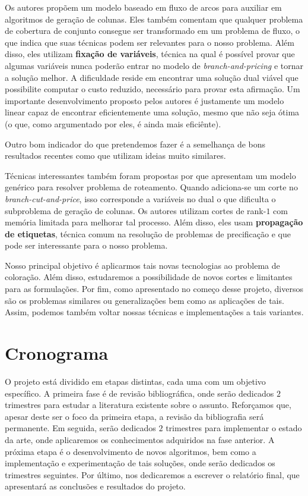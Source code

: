 \documentclass[11pt]{article}
\begin{document}
Os autores propõem um modelo baseado em fluxo de arcos para auxiliar em algoritmos de geração de colunas.
Eles também comentam que qualquer problema de cobertura de conjunto consegue ser transformado em um problema de fluxo, o que indica que suas técnicas podem ser relevantes para o nosso problema.
Além disso, eles utilizam \textbf{fixação de variáveis}, técnica na qual é possível provar que algumas variáveis nunca poderão entrar no modelo de \emph{branch-and-pricing} e tornar a solução melhor.
A dificuldade reside em encontrar uma solução dual viável que possibilite computar o custo reduzido, necessário para provar esta afirmação.
Um importante desenvolvimento proposto pelos autores é justamente um modelo linear capaz de encontrar eficientemente uma solução, mesmo que não seja ótima (o que, como argumentado por eles, é ainda mais eficiênte).

Outro bom indicador do que pretendemos fazer é a semelhança de bons resultados recentes como \autocite{Hoeve2021Graphcoloringdecision} que utilizam ideias muito similares.

Técnicas interessantes também foram propostas por \textcite{Pessoa2021SolvingBinPacking} que apresentam um modelo genérico para resolver problema de roteamento.
Quando adiciona-se um corte no \emph{branch-cut-and-price}, isso corresponde a variáveis no dual o que dificulta o subproblema de geração de colunas.
Os autores utilizam cortes de rank-\(1\) com memória limitada para melhorar tal processo.
Além disso, eles usam \textbf{propagação de etiquetas}, técnica comum na resolução de problemas de precificação e que pode ser interessante para o nosso problema.

Nosso principal objetivo é aplicarmos tais novas tecnologias ao problema de coloração.
Além disso, estudaremos a possibilidade de novos cortes e limitantes para as formulações.
Por fim, como apresentado no começo desse projeto, diversos são os problemas similares ou generalizações bem como as aplicações de tais.
Assim, podemos também voltar nossas técnicas e implementações a tais variantes.

\section{Cronograma}
\label{sec:orgd65f956}
O projeto está dividido em etapas distintas, cada uma com um objetivo específico.
A primeira fase é de revisão bibliográfica, onde serão dedicados \(2\) trimestres para estudar a literatura existente sobre o assunto.
Reforçamos que, apesar deste ser o foco da primeira etapa, a revisão da bibliografia será permanente.
Em seguida, serão dedicados \(2\) trimestres para implementar o estado da arte, onde aplicaremos os conhecimentos adquiridos na fase anterior.
A próxima etapa é o desenvolvimento de novos algoritmos, bem como a implementação e experimentação de tais soluções, onde serão dedicados os trimestres seguintes.
Por último, nos dedicaremos a escrever o relatório final, que apresentará as conclusões e resultados do projeto.
\end{document}
